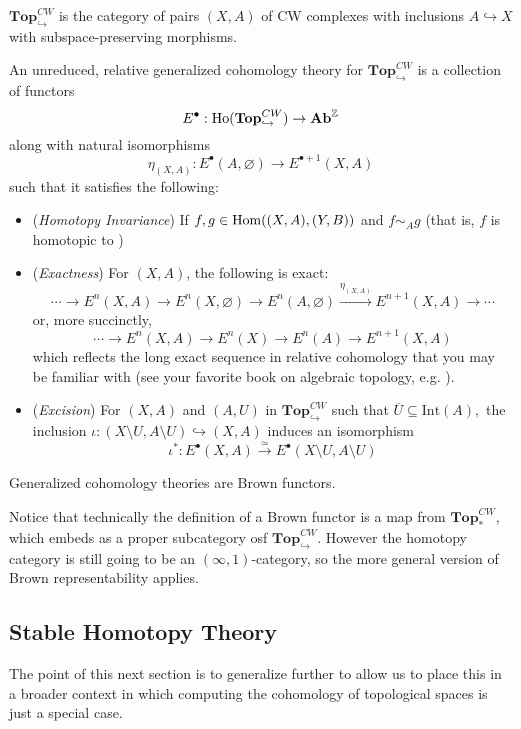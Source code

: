 \documentclass[12pt]{article}
\newcommand*{\pCW}{\mathbf{Top}^{CW}_\ast}
\newcommand*{\relCW}{\mathbf{Top}^{CW}_{\hookrightarrow}}
\begin{document}
\begin{defn} 
	$\relCW$ is the category of pairs $(X,A)$ of CW complexes with inclusions $A\hookrightarrow X$ with subspace-preserving 
morphisms.
\end{defn}

\begin{defn}
	An unreduced, relative generalized cohomology theory for $\relCW$ is a collection of functors 
	\[E^\bullet:\text{Ho}(\relCW)\to\Ab^\bbZ\]
	along with natural isomorphisms
	\[\eta_{(X,A)}:E^\bullet(A,\varnothing)\to E^{\bullet+1}(X,A)\]
	such that it satisfies the following: 
	\begin{itemize}
		\item (\textit{Homotopy Invariance}) If $f,g\in\operatorname{Hom}((X,A),(Y,B))$ and $f\sim_Ag$ (that is, $f$ is homotopic to )
		\item (\textit{Exactness}) For $(X,A)$, the following is exact:
		\[\cdots\to E^n(X,A)\to E^n(X,\varnothing)\to E^n(A,\varnothing)\xrightarrow{\eta_{(X,A)}}E^{n+1}(X,A)\to\cdots\]
		or, more succinctly,
		\[\cdots\to E^n(X,A)\to E^n(X)\to E^n(A)\to E^{n+1}(X,A)\]
		which reflects the long exact sequence in relative cohomology that you may be familiar with (see your favorite book on algebraic topology, e.g.
		\cite[p.199]{hatcher}).
		\item (\textit{Excision}) For $(X,A)$ and $(A,U)$ in $\relCW$ such that $\overline{U}\subseteq \text{Int}(A),$ the
		inclusion $\iota:(X\setminus U,A\setminus U)\hookrightarrow (X,A)$ induces an isomorphism
		\[\iota^\ast:E^\bullet(X,A)\xrightarrow{\simeq}E^\bullet(X\setminus U,A\setminus U)\]
	\end{itemize}
\end{defn}
\begin{prop}
	Generalized cohomology theories are Brown functors.
\end{prop}
\begin{rmk}
	Notice that technically the definition of a Brown functor is a map from $\pCW$, which embeds as a proper subcategory osf $\relCW$. However 
	the homotopy category is still going to be an $(\infty,1)$-category, so the more general version of Brown representability applies.
\end{rmk}

\subsection{Stable Homotopy Theory}
The point of this next section is to generalize further to allow us to place this in a broader context in which 
computing the cohomology of topological spaces is just a special case.
\end{document}
